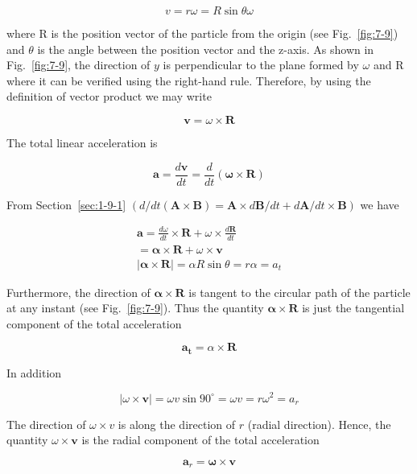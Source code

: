 \documentclass[10pt]{article}
\numberwithin{equation}{section}
\begin{document}
$$
v=r \omega=R \sin \theta \omega
$$

where R is the position vector of the particle from the origin (see Fig.~\ref{fig:7-9}) and $\theta$ is the angle between the position vector and the z-axis. As shown in Fig.~\ref{fig:7-9}, the direction of $y$ is perpendicular to the plane formed by $\omega$ and R where it can be verified using the right-hand rule. Therefore, by using the definition of vector product we may write


\begin{equation}
\mathbf{v}=\omega \times \mathbf{R} \label{eq:7-7}
\end{equation}


The total linear acceleration is

$$
\mathbf{a}=\frac{d \mathbf{v}}{d t}=\frac{d}{d t}(\boldsymbol{\omega} \times \mathbf{R})
$$

From Section~\ref{sec:1-9-1} $(d / d t(\mathbf{A} \times \mathbf{B})=\mathbf{A} \times d \mathbf{B} / d t+d \mathbf{A} / d t \times \mathbf{B})$ we have

$$
\begin{gathered}
\mathbf{a}=\frac{d \omega}{d t} \times \mathbf{R}+\omega \times \frac{d \mathbf{R}}{d t} \\
=\boldsymbol{\alpha} \times \mathbf{R}+\omega \times \mathbf{v} \\
|\boldsymbol{\alpha} \times \mathbf{R}|=\alpha R \sin \theta=r \alpha=a_{t}
\end{gathered}
$$

Furthermore, the direction of $\boldsymbol{\alpha} \times \mathbf{R}$ is tangent to the circular path of the particle at any instant (see Fig.~\ref{fig:7-9}). Thus the quantity $\boldsymbol{\alpha} \times \mathbf{R}$ is just the tangential component of the total acceleration


\begin{equation}
\mathbf{a}_{\mathbf{t}}=\alpha \times \mathbf{R} \label{eq:7-8}
\end{equation}


In addition

$$
|\omega \times \mathbf{v}|=\omega v \sin 90^{\circ}=\omega v=r \omega^{2}=a_{r}
$$

The direction of $\omega \times v$ is along the direction of $r$ (radial direction). Hence, the quantity $\omega \times \mathbf{v}$ is the radial component of the total acceleration


\begin{equation}
\mathbf{a}_{r}=\boldsymbol{\omega} \times \mathbf{v} \label{eq:7-9}
\end{equation}
\end{document}
